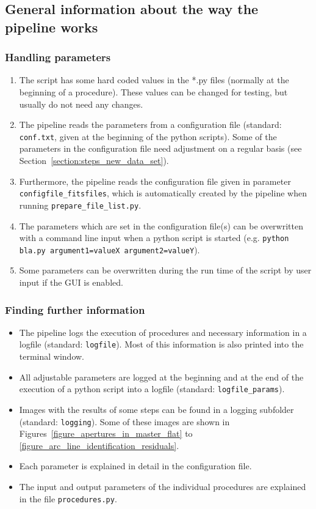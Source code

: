 \documentclass[10pt,a4paper]{article}
\begin{document}
\subsection{General information about the way the pipeline works}

\subsubsection{Handling parameters}

\begin{enumerate}
  \item The script has some hard coded values in the *.py files (normally at the beginning of a procedure). These values can be changed for testing, but usually do not need any changes.
  \item The pipeline reads the parameters from a configuration file (standard: \verb|conf.txt|, given at the beginning of the python scripts). Some of the parameters in the configuration file need adjustment on a regular basis (see Section~\ref{section:steps_new_data_set}).
  \item Furthermore, the pipeline reads the configuration file given in parameter \verb|configfile_fitsfiles|, which is automatically created by the pipeline when running \verb|prepare_file_list.py|.
  \item The parameters which are set in the configuration file(s) can be overwritten with a command line input when a python script is started (e.g. \verb|python bla.py argument1=valueX argument2=valueY|).
  \item Some parameters can be overwritten during the run time of the script by user input if the GUI is enabled.
\end{enumerate}

\subsubsection{Finding further information}

\begin{itemize}
  \item The pipeline logs the execution of procedures and necessary information in a logfile (standard: \verb|logfile|). Most of this information is also printed into the terminal window.
  \item All adjustable parameters are logged at the beginning and at the end of the execution of a python script into a logfile (standard: \verb|logfile_params|).
  \item Images with the results of some steps can be found in a logging subfolder (standard: \verb|logging|). Some of these images are shown in Figures~\ref{figure_apertures_in_master_flat} to \ref{figure_arc_line_identification_residuals}.
  \item Each parameter is explained in detail in the configuration file.
  \item The input and output parameters of the individual procedures are explained in the file \verb|procedures.py|.
\end{itemize}
\end{document}
